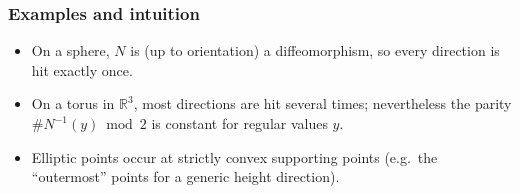 \documentclass[12pt,a4paper]{article}
\theoremstyle{plain}
\theoremstyle{definition}      %
\begin{document}
	\subsubsection*{Examples and intuition}
	\begin{itemize}
		\item On a sphere, $N$ is (up to orientation) a diffeomorphism, so every direction is hit exactly once.
		\item On a torus in $\mathbb R^3$, most directions are hit several times; nevertheless the parity
		$\#N^{-1}(y)\bmod 2$ is constant for regular values $y$.
		\item Elliptic points occur at strictly convex supporting points (e.g.\ the ``outermost'' points
		for a generic height direction).
	\end{itemize}
	
\end{document}

